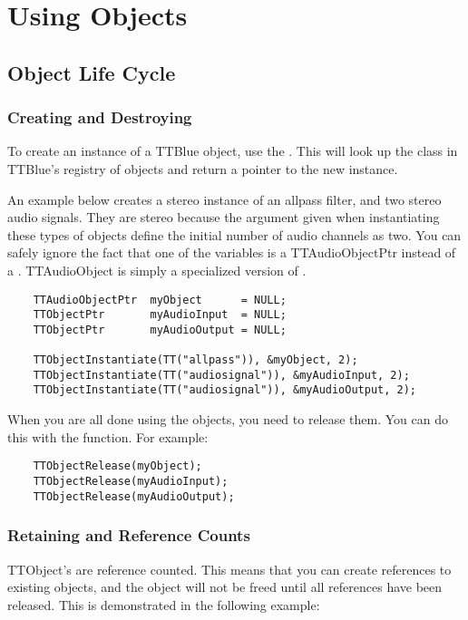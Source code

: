 \chapter{Using Objects}


\section{Object Life Cycle}

\subsection{Creating and Destroying}

To create an instance of a TTBlue object, use the .  
This will look up the class in TTBlue’s registry of objects and return a pointer to the new instance. 
 
An example below creates a stereo instance of an allpass filter, and two stereo audio signals.
They are stereo because the argument given when instantiating these types of objects define the initial number of audio channels as two.
You can safely ignore the fact that one of the variables is a TTAudioObjectPtr instead of a .  
TTAudioObject is simply a specialized version of .

\begin{lstlisting}
	TTAudioObjectPtr  myObject      = NULL;
	TTObjectPtr       myAudioInput  = NULL;
	TTObjectPtr       myAudioOutput = NULL;

	TTObjectInstantiate(TT("allpass")), &myObject, 2);
	TTObjectInstantiate(TT("audiosignal")), &myAudioInput, 2);
	TTObjectInstantiate(TT("audiosignal")), &myAudioOutput, 2);
\end{lstlisting}

When you are all done using the objects, you need to release them.  
You can do this with the  function.  
For example:

\begin{lstlisting}
	TTObjectRelease(myObject);
	TTObjectRelease(myAudioInput);
	TTObjectRelease(myAudioOutput);
\end{lstlisting}


\subsection{Retaining and Reference Counts}

TTObject’s are reference counted.  This means that you can create references to existing objects, and the object will not be freed until all references have been released.  This is demonstrated in the following example:

